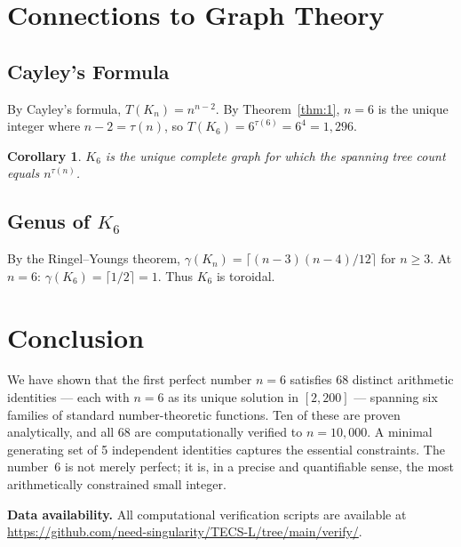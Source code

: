 \documentclass{article}
\newtheorem{corollary}[theorem]{Corollary}
\begin{document}
\section{Connections to Graph Theory}

\subsection{Cayley's Formula}

By Cayley's formula, $T(K_n) = n^{n-2}$. By Theorem~\ref{thm:1}, $n = 6$ is the unique integer where $n - 2 = \tau(n)$, so $T(K_6) = 6^{\tau(6)} = 6^4 = 1{,}296$.

\begin{corollary}
$K_6$ is the unique complete graph for which the spanning tree count equals $n^{\tau(n)}$.
\end{corollary}

\subsection{Genus of $K_6$}

By the Ringel--Youngs theorem, $\gamma(K_n) = \lceil (n-3)(n-4)/12 \rceil$ for $n \geq 3$. At $n = 6$: $\gamma(K_6) = \lceil 1/2 \rceil = 1$. Thus $K_6$ is toroidal.

\section{Conclusion}

We have shown that the first perfect number $n = 6$ satisfies 68 distinct arithmetic identities --- each with $n = 6$ as its unique solution in $[2, 200]$ --- spanning six families of standard number-theoretic functions. Ten of these are proven analytically, and all 68 are computationally verified to $n = 10{,}000$. A minimal generating set of 5 independent identities captures the essential constraints. The number~6 is not merely perfect; it is, in a precise and quantifiable sense, the most arithmetically constrained small integer.

\bigskip
\noindent\textbf{Data availability.} All computational verification scripts are available at \url{https://github.com/need-singularity/TECS-L/tree/main/verify/}.
\end{document}
